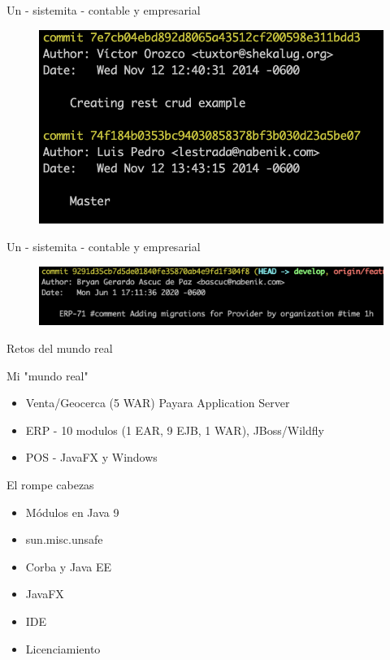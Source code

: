 \documentclass[aspectratio=169]{beamer}
\begin{document}
\begin{frame}[fragile]{Un - sistemita - contable y empresarial}

    \begin{figure}
        \centering
        \includegraphics[width=0.7\linewidth]{Images/erpcommit1}
    \end{figure}
\end{frame}

\begin{frame}[fragile]{Un - sistemita - contable y empresarial}

    \begin{figure}
        \centering
        \includegraphics[width=\linewidth]{Images/erpcommit2}
    \end{figure}
\end{frame}


\begin{frame}[fragile]{Retos del mundo real}\scriptsize

Mi "mundo real"
    \begin{itemize}
        \item Venta/Geocerca (5 WAR) Payara Application Server
        \item ERP - 10 modulos (1 EAR, 9 EJB, 1 WAR), JBoss/Wildfly
        \item POS - JavaFX y Windows
    \end{itemize}
El rompe cabezas
\begin{itemize}
    \item Módulos en Java 9
    \item sun.misc.unsafe
    \item Corba y Java EE
    \item JavaFX
    \item IDE
    \item Licenciamiento
\end{itemize}
\end{frame}
\end{document}
